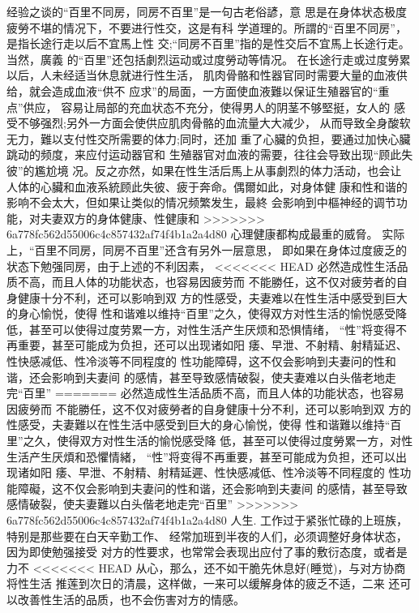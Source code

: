 \documentclass[12pt,UTF8]{ctexbook}
\begin{document}
经验之谈的“百里不同房，同房不百里”是一句古老俗諺，意
思是在身体状态极度疲勞不堪的情况下，不要进行性交，这是有科
学道理的。所謂的“百里不同房”，是指长途行走以后不宜馬上性
交;“同房不百里”指的是性交后不宜馬上长途行走。当然，廣義
的“百里”还包括劇烈运动或过度勞动等情况。
在长途行走或过度勞累以后，人未经适当休息就进行性生活，
肌肉骨骼和性器官同时需要大量的血液供给，就会造成血液“供不
应求”的局面，一方面使血液難以保证生殖器官的“重点”供应，
容易让局部的充血状态不充分，使得男人的阴茎不够堅挺，女人的
感受不够强烈;另外一方面会使供应肌肉骨骼的血流量大大减少，
从而导致全身酸软无力，難以支付性交所需要的体力;同时，还加
重了心臟的负担，要通过加快心臟跳动的频度，来应付运动器官和
生殖器官对血液的需要，往往会导致出现“顾此失彼”的尷尬境
况。反之亦然，如果在性生活后馬上从事劇烈的体力活动，也会让
人体的心臟和血液系統顾此失彼、疲于奔命。偶爾如此，对身体健
康和性和谐的影响不会太大，但如果让类似的情况频繁发生，最終
会影响到中樞神经的调节功能，对夫妻双方的身体健康、性健康和
>>>>>>> 6a778fc562d55006c4c857432af74f4b1a2a4d80
心理健康都构成最重的威脅。
实际上，“百里不同房，同房不百里”还含有另外一层意思，
即如果在身体过度疲乏的状态下勉强同房，由于上述的不利因素，
<<<<<<< HEAD
必然造成性生活品质不高，而且人体的功能状态，也容易因疲劳而
不能勝任，这不仅对疲劳者的自身健康十分不利，还可以影响到双
方的性感受，夫妻难以在性生活中感受到巨大的身心愉悦，使得
性和谐难以维持“百里”之久，使得双方对性生活的愉悦感受降
低，甚至可以使得过度劳累一方，对性生活产生厌烦和恐惧情绪，
“性”将变得不再重要，甚至可能成为负担，还可以出现诸如阳
痿、早泄、不射精、射精延迟、性快感减低、性冷淡等不同程度的
性功能障碍，这不仅会影响到夫妻问的性和谐，还会影响到夫妻间
的感情，甚至导致感情破裂，使夫妻难以白头偕老地走完“百里”
=======
必然造成性生活品质不高，而且人体的功能状态，也容易因疲勞而
不能勝任，这不仅对疲勞者的自身健康十分不利，还可以影响到双
方的性感受，夫妻難以在性生活中感受到巨大的身心愉悦，使得
性和谐難以维持“百里”之久，使得双方对性生活的愉悦感受降
低，甚至可以使得过度勞累一方，对性生活产生厌煩和恐懼情緒，
“性”将变得不再重要，甚至可能成为负担，还可以出现诸如阳
痿、早泄、不射精、射精延遲、性快感减低、性冷淡等不同程度的
性功能障礙，这不仅会影响到夫妻问的性和谐，还会影响到夫妻间
的感情，甚至导致感情破裂，使夫妻難以白头偕老地走完“百里”
>>>>>>> 6a778fc562d55006c4c857432af74f4b1a2a4d80
人生.
工作过于紧张忙碌的上班族，特别是那些要在白天辛勤工作、
经常加班到半夜的人们，必须调整好身体状态，因为即使勉强接受
对方的性要求，也常常会表现出应付了事的敷衍态度，或者是力不
<<<<<<< HEAD
从心，那么，还不如干脆先休息好(睡觉)，与对方协商将性生活
推莲到次日的清晨，这样做，一来可以缓解身体的疲乏不适，二来
还可以改善性生活的品质，也不会伤害对方的情感。
\end{document}
